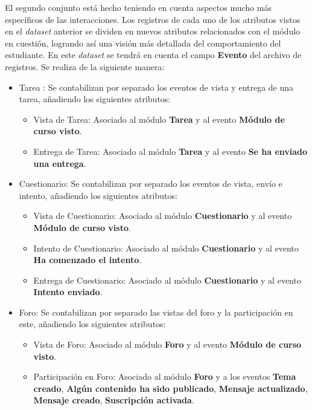 El segundo conjunto está hecho teniendo en cuenta aspectos mucho más específicos de las interacciones. Los registros de cada uno de los atributos vistos en el \textit{dataset} anterior se dividen en nuevos atributos relacionados con el módulo en cuestión, logrando así una visión más detallada del comportamiento del estudiante. En este \textit{dataset} se tendrá en cuenta el campo \textbf{Evento} del archivo de registros.  Se realiza de la siguiente manera:  
\begin{itemize}
    \item Tarea : Se contabilizan por separado los eventos de vista y entrega de una tarea, añadiendo los siguientes atributos:
    \begin{itemize}
        \item Vista de Tarea: Asociado al módulo \textbf{Tarea} y al evento \textbf{Módulo de curso visto}.
        \item Entrega de Tarea: Asociado al módulo \textbf{Tarea} y al evento \textbf{Se ha enviado una entrega}.
    \end{itemize}
    \item Cuestionario: Se contabilizan por separado los eventos de vista, envío e intento, añadiendo los siguientes atributos:
    \begin{itemize}
        \item Vista de Cuestionario: Asociado al módulo \textbf{Cuestionario} y al evento \textbf{Módulo de curso visto}.
        \item Intento de Cuestionario: Asociado al módulo \textbf{Cuestionario} y al evento \textbf{Ha comenzado el intento}.
        \item Entrega de Cuestionario: Asociado al módulo \textbf{Cuestionario} y al evento \textbf{Intento enviado}.
    \end{itemize}
    \item Foro: Se contabilizan por separado las vistas del foro y la participación en este, añadiendo los siguientes atributos:
    \begin{itemize}
        \item Vista de Foro: Asociado al módulo \textbf{Foro} y al evento \textbf{Módulo de curso visto}.
        \item Participación en Foro: Asociado al módulo \textbf{Foro} y a los eventos \textbf{Tema creado}, \textbf{Algún contenido ha sido publicado}, \textbf{Mensaje actualizado}, \textbf{Mensaje creado}, \textbf{Suscripción activada}.
    \end{itemize}
\end{itemize}

